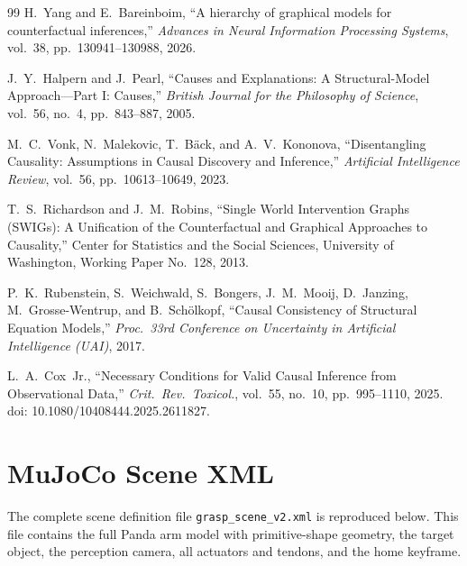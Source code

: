 \documentclass[11pt,a4paper]{report}
\begin{document}
\begin{thebibliography}{99}
H.~Yang and E.~Bareinboim,
``A hierarchy of graphical models for counterfactual inferences,''
\emph{Advances in Neural Information Processing Systems}, vol.~38, pp.~130941--130988, 2026.

J.~Y.~Halpern and J.~Pearl,
``Causes and Explanations: A Structural-Model Approach---Part I: Causes,''
\emph{British Journal for the Philosophy of Science}, vol.~56, no.~4,
pp.~843--887, 2005.

M.~C.~Vonk, N.~Malekovic, T.~B\"ack, and A.~V.~Kononova,
``Disentangling Causality: Assumptions in Causal Discovery and Inference,''
\emph{Artificial Intelligence Review}, vol.~56, pp.~10613--10649, 2023.

T.~S.~Richardson and J.~M.~Robins,
``Single World Intervention Graphs (SWIGs): A Unification of the
Counterfactual and Graphical Approaches to Causality,''
Center for Statistics and the Social Sciences, University of Washington,
Working Paper No.~128, 2013.

P.~K.~Rubenstein, S.~Weichwald, S.~Bongers, J.~M.~Mooij, D.~Janzing,
M.~Grosse-Wentrup, and B.~Sch\"olkopf,
``Causal Consistency of Structural Equation Models,''
\emph{Proc.\ 33rd Conference on Uncertainty in Artificial Intelligence
(UAI)}, 2017.

L.~A.~Cox~Jr.,
``Necessary Conditions for Valid Causal Inference from Observational Data,''
\emph{Crit.\ Rev.\ Toxicol.}, vol.~55, no.~10, pp.~995--1110, 2025.
doi: 10.1080/10408444.2025.2611827.


\end{thebibliography}

\appendix

\chapter{MuJoCo Scene XML}
\label{app:scene_xml}

The complete scene definition file \texttt{grasp\_scene\_v2.xml} is reproduced below. This file contains the full Panda arm model with primitive-shape geometry, the target object, the perception camera, all actuators and tendons, and the home keyframe.
\end{document}
